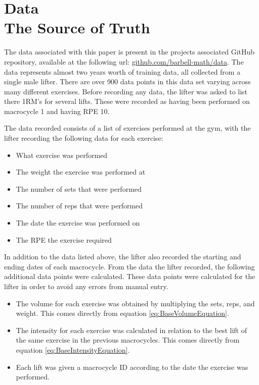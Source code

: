 \chapter{
    Data
    \\
    \large{The Source of Truth}
}
\label{sec:DataSection}

The data associated with this paper is present in the projects associated GitHub repository, available at the following url:  \url{github.com/barbell-math/data}.
The data represents almost two years worth of training data, all collected from a single male lifter. There are over 900 data points in this data set varying across many different exercises. Before recording any data, the lifter was asked to list there 1RM's for several lifts. These were recorded as having been performed on macrocycle 1 and having RPE 10.

The data recorded consists of a list of exercises performed at the gym, with the lifter recording the following data for each exercise:

\begin{itemize}
    \item What exercise was performed
    \item The weight the exercise was performed at
    \item The number of sets that were performed
    \item The number of reps that were performed
    \item The date the exercise was performed on
    \item The RPE the exercise required
\end{itemize}

In addition to the data listed above, the lifter also recorded the starting and ending dates of each macrocycle. From the data the lifter recorded, the following additional data points were calculated. These data points were calculated for the lifter in order to avoid any errors from manual entry.

\begin{itemize}
    \item The volume for each exercise was obtained by multiplying the sets, reps, and weight. This comes directly from equation \ref{eq:BaseVolumeEquation}.
    \item The intensity for each exercise was calculated in relation to the best lift of the same exercise in the previous macrocycles. This comes directly from equation \ref{eq:BaseIntensityEquation}.
    \item Each lift was given a macrocycle ID according to the date the exercise was performed.
\end{itemize}

